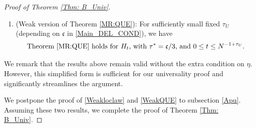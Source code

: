 \documentclass[10pt,reqno]{article}
\theoremstyle{plain} %
\theoremstyle{remark}
\numberwithin{equation}{section}
\begin{document}
\begin{proof}[Proof of Theorem \ref{Thm: B_Univ}]
\begin{enumerate}
    \item (Weak version of Theorem \ref{MR:QUE}): For sufficiently small fixed $\tau_U$ (depending on $\mathfrak{c}$ in \eqref{Main_DEL_COND}), we have
    \begin{equation}\label{WeakQUE}
        \text{Theorem \ref{MR:QUE} holds for $H_t$, with $\tau^* = \mathfrak{c}/3$, and $0 \leq t \le N^{-1+\tau_U}$.}
    \end{equation}
\end{enumerate}
We remark that the results above remain valid without the extra condition on $\eta$. However, this simplified form is sufficient for our universality proof and significantly streamlines the argument.

  
We postpone  the proof  of \eqref{Weakloclaw} and \eqref{WeakQUE} to subsection \ref{Apu}. 
Assuming these two results, we complete the proof of  Theorem \ref{Thm: B_Univ}. 



\end{proof}
\end{document}
